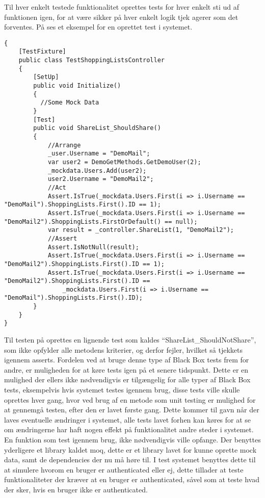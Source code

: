 Til hver enkelt testede funktionalitet oprettes tests for hver enkelt sti ud af funktionen igen, for at være sikker på hver enkelt logik tjek agerer som det forventes.
På  ses et eksempel for en oprettet test i systemet.

\begin{lstlisting}
{
    [TestFixture]
    public class TestShoppingListsController
    {
		[SetUp]
        public void Initialize()
        {
          //Some Mock Data
        }
        [Test]
        public void ShareList_ShouldShare()
        {
            //Arrange
            _user.Username = "DemoMail";
            var user2 = DemoGetMethods.GetDemoUser(2);
            _mockdata.Users.Add(user2); 
            user2.Username = "DemoMail2";
            //Act
            Assert.IsTrue(_mockdata.Users.First(i => i.Username == "DemoMail").ShoppingLists.First().ID == 1);
            Assert.IsTrue(_mockdata.Users.First(i => i.Username == "DemoMail2").ShoppingLists.FirstOrDefault() == null);
            var result = _controller.ShareList(1, "DemoMail2");
            //Assert
            Assert.IsNotNull(result);
            Assert.IsTrue(_mockdata.Users.First(i => i.Username == "DemoMail2").ShoppingLists.First().ID == 1);
            Assert.IsTrue(_mockdata.Users.First(i => i.Username == "DemoMail2").ShoppingLists.First().ID == 
                _mockdata.Users.First(i => i.Username == "DemoMail").ShoppingLists.First().ID);
        }
    }
}        
\end{lstlisting}\label{lsttest}
Til testen på  oprettes en lignende test som kaldes ``ShareList\_ShouldNotShare'', som ikke opfylder alle metodens kriterier, og derfor fejler, hvilket så tjekkets igennem asserts.
Fordelen ved at bruge denne type af Black Box tests frem for andre, er muligheden for at køre tests igen på et senere tidspunkt.
Dette er en mulighed der ellers ikke nødvendigvis er tilgængelig for alle typer af Black Box tests, eksempelvis hvis systemet testes igennem brug, disse tests ville skulle oprettes hver gang, hvor ved brug af en metode som unit testing er mulighed for at gennemgå testen, efter den er lavet første gang.
Dette kommer til gavn når der laves eventuelle ændringer i systemet, alle tests lavet forhen kan køres for at se om ændringerne har haft nogen effekt på funktionalitet andre steder i systemet. 
En funktion som test igennem brug, ikke nødvendigvis ville opfange.
Der benyttes yderligere et library kaldet moq, dette er et library lavet for kunne oprette mock data, samt de dependencies der nu må høre til.
I test systemet benyttes dette til at simulere hvorom en bruger er authenticated eller ej, dette tillader at teste funktionaliteter der kræver at en bruger er authenticated, såvel som at teste hvad der sker, hvis en bruger ikke er authenticated.
